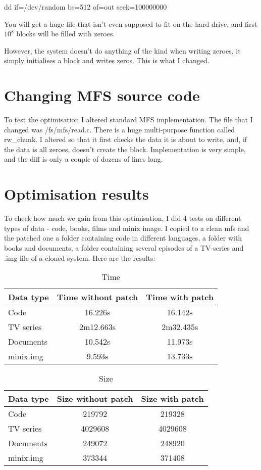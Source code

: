 \documentclass{sig-alternate-05-2015}
\begin{document}
dd if=/dev/random bs=512 of=out seek=100000000

You will get a huge file that isn't even supposed to fit on the hard drive, and first $10^8$ blocks
will be filled with zeroes.

However, the system doesn't do anything of the kind when 
writing zeroes, it simply initialises a block and writes zeros. 
This is what I changed.

\section{Changing MFS source code}

To test the optimisation I altered standard MFS implementation.
The file that I changed was /fs/mfs/read.c.
There is a huge multi-purpose function called rw\_chunk. I altered so that
it first checks the data it is about to write, and, if the data is all zeroes,
doesn't create the block. Implementation is very simple, and the diff is only a couple
of dozens of lines long.

\section{Optimisation results}

To check how much we gain from this optimisation, I did 4 tests on different types of data -
code, books, films and minix image. 
I copied to a clean mfs and the patched one a folder containing code in
different languages, a folder with books and documents, a folder 
containing several episodes of a TV-series and .img file of a cloned system. Here are the results:

\begin{table}[ht]
\caption{Time}
\vspace{0.25cm}
\begin{tabular}{|l|c|c|}
    \hline
    Data type & Time without patch & Time with patch \\ 
    \hline
    Code & 16.226s & 16.142s \\
    TV series & 2m12.663s & 2m32.435s \\
    Documents & 10.542s & 11.973s \\
    minix.img & 9.593s & 13.733s \\
    \hline
\end{tabular}
\end{table}

\begin{table}[ht]
\caption{Size}
    \vspace{0.25cm}
\begin{tabular}{|l|c|c|}
    \hline
    Data type & Size without patch & Size with patch \\
    \hline
    Code & 219792 & 219328 \\
    TV series & 4029608 & 4029608 \\
    Documents & 249072 & 248920 \\
    minix.img & 373344 & 371408 \\
    \hline
\end{tabular}
\end{table}
\end{document}

